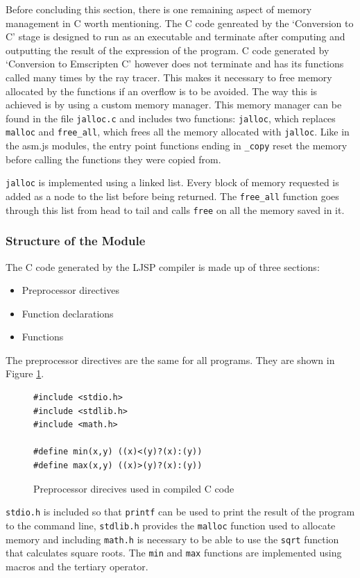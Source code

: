 \documentclass[11pt]{report}
\begin{document}
Before concluding this section, there is one remaining aspect of memory management in C worth mentioning. The C code genreated by the `Conversion to C' stage is designed to run as an executable and terminate after computing and outputting the result of the expression of the program. C code generated by `Conversion to Emscripten C' however does not terminate and has its functions called many times by the ray tracer. This makes it necessary to free memory allocated by the functions if an overflow is to be avoided. The way this is achieved is by using a custom memory manager. This memory manager can be found in the file \texttt{jalloc.c} and includes two functions: \texttt{jalloc}, which replaces \texttt{malloc} and \texttt{free_all}, which frees all the memory allocated with \texttt{jalloc}. Like in the asm.js modules, the entry point functions ending in \texttt{_copy} reset the memory before calling the functions they were copied from.

\texttt{jalloc} is implemented using a linked list. Every block of memory requested is added as a node to the list before being returned. The \texttt{free_all} function goes through this list from head to tail and calls \texttt{free} on all the memory saved in it.

\subsubsection{Structure of the Module}
The C code generated by the LJSP compiler is made up of three sections:
\begin{itemize}
\item Preprocessor directives
\item Function declarations
\item Functions
\end{itemize}

The preprocessor directives are the same for all programs. They are shown in Figure \ref{icmm4}.

\begin{figure}[ht]
\begin{lstlisting}
#include <stdio.h>
#include <stdlib.h>
#include <math.h>
    
#define min(x,y) ((x)<(y)?(x):(y))
#define max(x,y) ((x)>(y)?(x):(y))
\end{lstlisting}
\caption{Preprocessor direcives used in compiled C code}
\label{icmm4}
\end{figure}

\texttt{stdio.h} is included so that \texttt{printf} can be used to print the result of the program to the command line, \texttt{stdlib.h} provides the \texttt{malloc} function used to allocate memory and including \texttt{math.h} is necessary to be able to use the \texttt{sqrt} function that calculates square roots. The \texttt{min} and \texttt{max} functions are implemented using macros and the tertiary operator.
\end{document}
